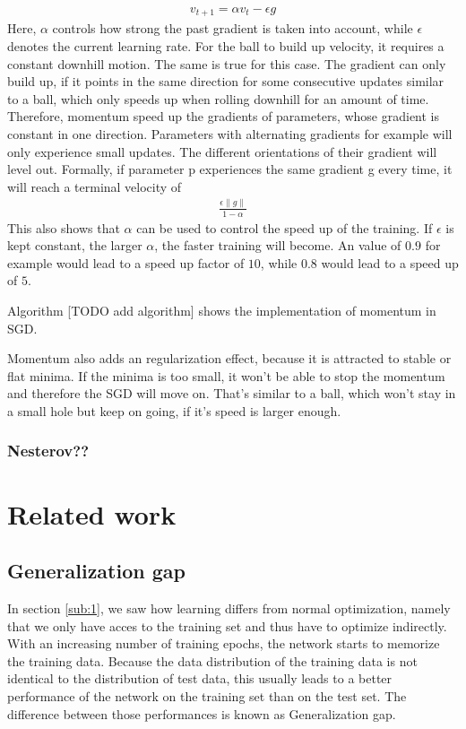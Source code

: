 \begin{align}
    v_{t+1}=\alpha v_t - \epsilon g
\end{align}
Here, $\alpha$ controls how strong the past gradient is taken into account,
while $\epsilon$ denotes the current learning rate. For the ball to build up
velocity, it requires a constant downhill motion. The same is true for this
case. The gradient can only build up, if it points in the same direction for
some consecutive updates similar to a ball, which only speeds up when rolling
downhill for an amount of time. Therefore, momentum speed up the gradients of
parameters, whose gradient is constant in one direction. Parameters with
alternating gradients for example will only experience small updates. The
different orientations of their gradient will level out. Formally, if parameter
p experiences the same gradient g every time, it will reach a terminal velocity
of
\begin{align}
    \frac{\epsilon \lVert g \rVert}{1-\alpha}
\end{align}
This also shows that $\alpha$ can be used to control the speed up of the
training. If $\epsilon$ is kept constant, the larger $\alpha$, the faster
training will become. An value of $0.9$ for example would lead to a speed up
factor of $10$, while $0.8$ would lead to a speed up of $5$.

Algorithm [TODO add algorithm] shows the implementation of momentum in SGD.

Momentum also adds an regularization effect, because it is attracted to stable
or flat minima. If the minima is too small, it won't be able to stop the
momentum and therefore the SGD will move on. That's similar to a ball, which
won't stay in a small hole but keep on going, if it's speed is larger enough.



\subsubsection{Nesterov??}


\section{Related work}
\subsection{Generalization gap}\label{sub:Generalization}
In section \ref{sub:1}, we saw how learning differs from normal optimization,
namely that we only have acces to the training set and thus have to optimize
indirectly. With an increasing number of training epochs, the network starts to
memorize the training data. Because the data distribution of the training data
is not identical to the distribution of test data, this usually leads to a
better performance of the network on the training set than on the test set. The
difference between those performances is known as Generalization gap. 

